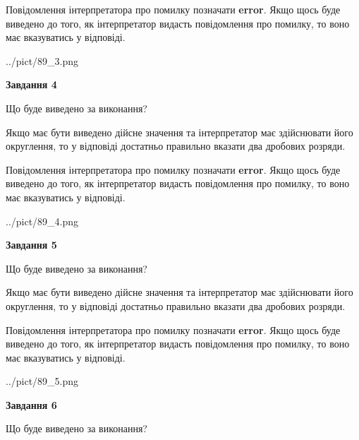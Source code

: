 \documentclass[12pt, ukrainian]{article}
\begin{document}
{\begin {Large}
Повідомлення інтерпретатора про помилку позначати \textbf{error}.
Якщо щось буде виведено до того, як інтерпретатор видасть повідомлення про помилку, 
то воно має вказуватись у відповіді. \par

\begin{center}
	{../pict/89_3.png}
\end{center}
\newpage

{\begin {center}\textbf{Завдання 4}\end {center}}\par
Що буде виведено за виконання? \par

Якщо має бути виведено дійсне значення та інтерпретатор має здійснювати його округлення, 
то у відповіді достатньо правильно вказати два дробових розряди.

Повідомлення інтерпретатора про помилку позначати \textbf{error}.
Якщо щось буде виведено до того, як інтерпретатор видасть повідомлення про помилку, 
то воно має вказуватись у відповіді. \par

\begin{center}
	{../pict/89_4.png}
\end{center}
\newpage

{\begin {center}\textbf{Завдання 5}\end {center}}\par
Що буде виведено за виконання? \par

Якщо має бути виведено дійсне значення та інтерпретатор має здійснювати його округлення, 
то у відповіді достатньо правильно вказати два дробових розряди.

Повідомлення інтерпретатора про помилку позначати \textbf{error}.
Якщо щось буде виведено до того, як інтерпретатор видасть повідомлення про помилку, 
то воно має вказуватись у відповіді. \par

\begin{center}
	{../pict/89_5.png}
\end{center}
\newpage

{\begin {center}\textbf{Завдання 6}\end {center}}\par
Що буде виведено за виконання? \par


\end{Large}}
\end{document}
